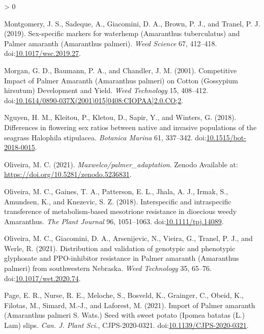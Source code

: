 \documentclass[utf8]{frontiersSCNS}
\newlength{\cslhangindent}
\newenvironment{CSLReferences}[2] %
 {%
  \setlength{\parindent}{0pt}
  \ifodd #1 \everypar{\setlength{\hangindent}{\cslhangindent}}\ignorespaces\fi
  \ifnum #2 > 0
  \setlength{\parskip}{#2\baselineskip}
  \fi
 }%
 {}
\begin{document}
\begin{CSLReferences}{1}{0}
\leavevmode\hypertarget{ref-montgomery2019}{}%
Montgomery, J. S., Sadeque, A., Giacomini, D. A., Brown, P. J., and
Tranel, P. J. (2019). Sex-specific markers for waterhemp ({Amaranthus}
tuberculatus) and {Palmer} amaranth ({Amaranthus} palmeri). \emph{Weed
Science} 67, 412--418.
doi:\href{https://doi.org/10.1017/wsc.2019.27}{10.1017/wsc.2019.27}.

\leavevmode\hypertarget{ref-morgan2001}{}%
Morgan, G. D., Baumann, P. A., and Chandler, J. M. (2001). Competitive
{Impact} of {Palmer Amaranth} ({Amaranthus} palmeri) on {Cotton}
({Gossypium} hirsutum) {Development} and {Yield}. \emph{Weed Technology}
15, 408--412.
doi:\href{https://doi.org/10.1614/0890-037X(2001)015\%5B0408:CIOPAA\%5D2.0.CO;2}{10.1614/0890-037X(2001)015{[}0408:CIOPAA{]}2.0.CO;2}.

\leavevmode\hypertarget{ref-nguyen2018}{}%
Nguyen, H. M., Kleitou, P., Kletou, D., Sapir, Y., and Winters, G.
(2018). Differences in flowering sex ratios between native and invasive
populations of the seagrass {Halophila} stipulacea. \emph{Botanica
Marina} 61, 337--342.
doi:\href{https://doi.org/10.1515/bot-2018-0015}{10.1515/bot-2018-0015}.

\leavevmode\hypertarget{ref-oliveira2021b}{}%
Oliveira, M. C. (2021). \emph{Maxwelco/palmer\_adaptation}. {Zenodo}
Available at: \url{https://doi.org/10.5281/zenodo.5236831}.

\leavevmode\hypertarget{ref-oliveira2018}{}%
Oliveira, M. C., Gaines, T. A., Patterson, E. L., Jhala, A. J., Irmak,
S., Amundsen, K., and Knezevic, S. Z. (2018). Interspecific and
intraspecific transference of metabolism-based mesotrione resistance in
dioecious weedy {Amaranthus}. \emph{The Plant Journal} 96, 1051--1063.
doi:\href{https://doi.org/10.1111/tpj.14089}{10.1111/tpj.14089}.

\leavevmode\hypertarget{ref-oliveira2021a}{}%
Oliveira, M. C., Giacomini, D. A., Arsenijevic, N., Vieira, G., Tranel,
P. J., and Werle, R. (2021). Distribution and validation of genotypic
and phenotypic glyphosate and {PPO}-inhibitor resistance in {Palmer}
amaranth ({Amaranthus} palmeri) from southwestern {Nebraska}. \emph{Weed
Technology} 35, 65--76.
doi:\href{https://doi.org/10.1017/wet.2020.74}{10.1017/wet.2020.74}.

\leavevmode\hypertarget{ref-page2021}{}%
Page, E. R., Nurse, R. E., Meloche, S., Bosveld, K., Grainger, C.,
Obeid, K., Filotas, M., Simard, M.-J., and Laforest, M. (2021). Import
of {Palmer} amaranth ({Amaranthus} palmeri {S}. {Wats}.) Seed with sweet
potato ({Ipomea} batatas ({L}.) {Lam}) slips. \emph{Can. J. Plant Sci.},
CJPS-2020-0321.
doi:\href{https://doi.org/10.1139/CJPS-2020-0321}{10.1139/CJPS-2020-0321}.


\end{CSLReferences}
\end{document}
